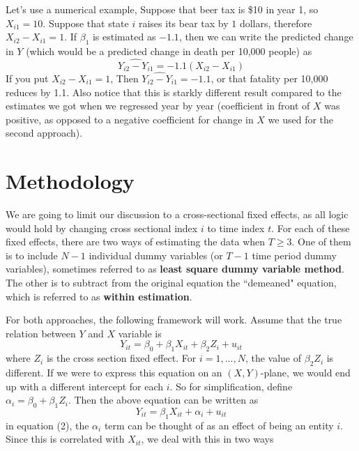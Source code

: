 Let's use a numerical example, Suppose that beer tax is \$10 in year 1, so $X_{i1}=10$. Suppose that state $i$ raises its bear tax by $1$ dollars, therefore $X_{i2}-X_{i1}=1$. If $\beta_1$ is estimated as  $-1.1$, then we can write the predicted change in $Y$ (which would be a predicted change in death per 10,000 people) as
\[
\widehat{Y_{i2}-Y_{i1}} = -1.1(X_{i2}-X_{i1})
\]
If you put  $X_{i2}-X_{i1}=1$, Then $\widehat{Y_{i2}-Y_{i1}} = -1.1$, or that fatality per 10,000 reduces by 1.1. Also notice that this is starkly different result compared to the estimates we got when we regressed year by year (coefficient in front of $X$ was positive, as opposed to a negative coefficient for change in $X$ we used for the second approach). \par\medskip
\section{Methodology}
We are going to limit our discussion to a cross-sectional fixed effects, as all logic would hold by changing cross sectional index $i$ to time index $t$. For each of these fixed effects, there are two ways of estimating the data when $T\geq 3$. One of them is to include $N-1$ individual dummy variables (or $T-1$ time period dummy variables), sometimes referred to as \textbf{least square dummy variable method}. The other is to subtract from the original equation the ``demeaned" equation, which is referred to as \textbf{within estimation}. \par\medskip
For both approaches, the following framework will work. Assume that the true relation between $Y$ and $X$ variable is 
\[
Y_{it}=\beta_0 + \beta_1X_{it}+\beta_2 Z_{i}+u_{it} \tag{1}
\]
where $Z_i$ is the cross section fixed effect. For $i=1,...,N$, the value of $\beta_2 Z_i$ is different. If we were to express this equation on an $(X,Y)$-plane, we would end up with a different intercept for each $i$. So for simplification, define $\alpha_i = \beta_0 + \beta_1Z_i$. Then the above equation can be written as
\[
Y_{it}=\beta_1X_{it}+\alpha_{i}+u_{it} \tag{2}
\]
in equation (2), the $\alpha_i$ term can be thought of as an effect of being an entity $i$. Since this is correlated with $X_{it}$, we deal with this in two ways
